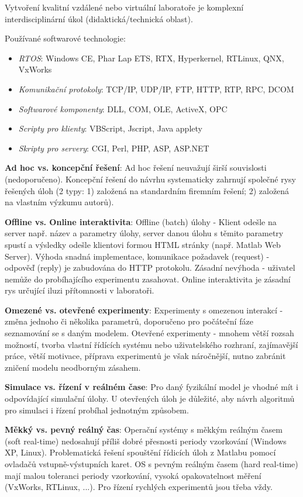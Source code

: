 Vytvoření kvalitní vzdálené nebo virtuální laboratoře je komplexní interdisciplinární úkol (didaktická/technická oblast).
\vspace{6cm}

Používané softwarové technologie:
\begin{itemize}
\item \textit{RTOS}: Windows CE, Phar Lap ETS, RTX, Hyperkernel, RTLinux, QNX, VxWorks
\item \textit{Komunikační protokoly}: TCP/IP, UDP/IP, FTP, HTTP, RTP, RPC, DCOM
\item \textit{Softwarové komponenty}: DLL, COM, OLE, ActiveX, OPC
\item \textit{Scripty pro klienty}: VBScript, Jscript, Java applety
\item \textit{Skripty pro servery}: CGI, Perl, PHP, ASP, ASP.NET
\end{itemize}

\textbf{Ad hoc vs. koncepční řešení}: Ad hoc řešení neuvažují širší souvislosti (nedoporučeno). Koncepční řešení do návrhu systematicky zahrnují společné rysy řešených úloh (2 typy: 1) založená na standardním firemním řešení; 2) založená na vlastním výzkumu autorů).

\textbf{Offline vs. Online interaktivita}: Offline (batch) úlohy - Klient odešle na server např. název a parametry úlohy, server danou úlohu s těmito parametry spustí a výsledky odešle klientovi formou HTML stránky (např. Matlab Web Server). Výhoda snadná implementace, komunikace požadavek (request) - odpověď (reply) je zabudována do HTTP protokolu. Zásadní nevýhoda - uživatel nemůže do probíhajícího experimentu zasahovat. Online interaktivita je zásadní rys určující iluzi přítomnosti v laboratoři.

\textbf{Omezené vs. otevřené experimenty}: Experimenty s omezenou interakcí  - změna jednoho či několika parametrů, doporučeno pro počáteční fáze seznamování se s daným modelem. Otevřené experimenty - mnohem větší rozsah možností, tvorba vlastní řídících systému nebo uživatelského rozhraní, zajímavější práce, větší motivace, příprava experimentů je však náročnější, nutno zabránit zničení modelu neodborným zásahem.

\textbf{Simulace vs. řízení v reálném čase}: Pro daný fyzikální model je vhodné mít i odpovídající simulační úlohy. U otevřených úloh je důležité, aby návrh algoritmů pro simulaci i řízení probíhal jednotným způsobem.

\textbf{Měkký vs. pevný reálný čas}: Operační systémy s měkkým reálným časem (soft real-time) nedosahují příliš dobré přesnosti periody vzorkování (Windows XP, Linux). Problematická řešení spouštění řídicích úloh z Matlabu pomocí ovladačů vstupně-výstupních karet. OS s pevným reálným časem (hard real-time) mají malou toleranci periody vzorkování, vysoká opakovatelnost měření (VxWorks, RTLinux, ...). Pro řízení rychlých experimentů jsou třeba vždy.


